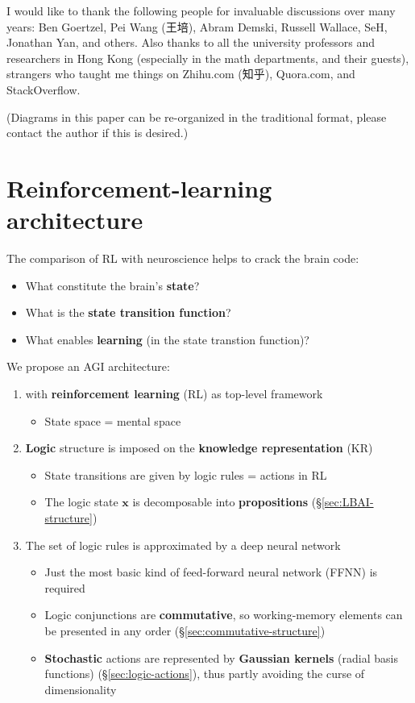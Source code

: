 \documentclass[orivec]{llncs}
\newcommand{\vect}[1]{\boldsymbol{#1}}
\begin{document}
I would like to thank the following people for invaluable discussions over many years:  Ben Goertzel, Pei Wang (王培), Abram Demski, Russell Wallace, SeH, Jonathan Yan, and others.  Also thanks to all the university professors and researchers in Hong Kong (especially in the math departments, and their guests), strangers who taught me things on Zhihu.com (知乎), Quora.com, and StackOverflow.

{\color{red}(Diagrams in this paper can be re-organized in the traditional format, please contact the author if this is desired.)}

\printbibliography

\pagebreak

\section{Reinforcement-learning architecture}

The comparison of RL with neuroscience helps to crack the brain code:
\begin{itemize}
	\item What constitute the brain's \textbf{state}?
	\item What is the \textbf{state transition function}?
	\item What enables \textbf{learning} (in the state transtion function)?
\end{itemize}

We propose an AGI architecture:
\begin{enumerate}
	\item with \textbf{reinforcement learning} (RL) as top-level framework
	\begin{itemize}
		\item State space = mental space
	\end{itemize}
	\item \textbf{Logic} structure is imposed on the \textbf{knowledge representation} (KR)
	\begin{itemize}
		\item State transitions are given by logic rules = actions in RL
		\item The logic state $\vect{x}$ is decomposable into \textbf{propositions} (\S\ref{sec:LBAI-structure})
	\end{itemize}
	\item The set of logic rules is approximated by a deep neural network
	\begin{itemize}
		\item Just the most basic kind of feed-forward neural network (FFNN) is required
		\item Logic conjunctions are \textbf{commutative}, so working-memory elements can be presented in any order (\S\ref{sec:commutative-structure})
		\item \textbf{Stochastic} actions are represented by \textbf{Gaussian kernels} (radial basis functions) (\S\ref{sec:logic-actions}), thus partly avoiding the curse of dimensionality
	\end{itemize}
\end{enumerate}
\end{document}
